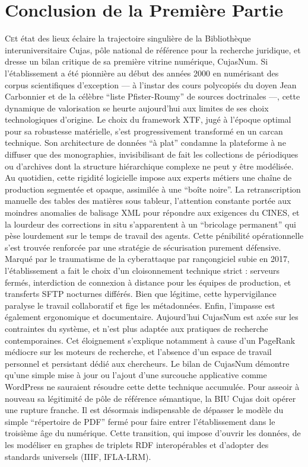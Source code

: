 \documentclass[12pt,twoside]{book}
\begin{document}
\section*{Conclusion de la Première Partie}
\lettrine{C}et état des lieux éclaire la trajectoire singulière de la Bibliothèque interuniversitaire Cujas, pôle national de référence pour la recherche juridique, et dresse un bilan critique de sa première vitrine numérique, CujasNum. Si l'établissement a été pionnière au début des années 2000 en numérisant des corpus scientifiques d'exception — à l'instar des cours polycopiés du doyen Jean Carbonnier et de la célèbre \enquote{liste Pfister-Roumy} de sources doctrinales —, cette dynamique de valorisation se heurte aujourd'hui aux limites de ses choix technologiques d'origine.
Le choix du framework \ac{XTF}, jugé à l'époque optimal pour sa robustesse matérielle, s'est progressivement transformé en un carcan technique. Son architecture de données \enquote{à plat} condamne la plateforme à ne diffuser que des monographies, invisibilisant de fait les collections de périodiques ou d'archives dont la structure hiérarchique complexe ne peut y être modélisée. Au quotidien, cette rigidité logicielle impose aux experts métiers une chaîne de production segmentée et opaque, assimilée à une \enquote{boîte noire}. La retranscription manuelle des tables des matières sous tableur, l'attention constante portée aux moindres anomalies de balisage \ac{XML} pour répondre aux exigences du \ac{CINES}, et la lourdeur des corrections in situ s'apparentent à un \enquote{bricolage permanent} qui pèse lourdement sur le temps de travail des agents.
Cette pénibilité opérationnelle s'est trouvée renforcée par une stratégie de sécurisation purement défensive. Marqué par le traumatisme de la cyberattaque par rançongiciel subie en 2017, l'établissement a fait le choix d'un cloisonnement technique strict : serveurs fermés, interdiction de connexion à distance pour les équipes de production, et transferts \ac{SFTP} nocturnes différés. Bien que légitime, cette hypervigilance paralyse le travail collaboratif et fige les métadonnées.
Enfin, l'impasse est également ergonomique et documentaire. Aujourd'hui CujasNum est axée sur les contraintes du système, et n'est plus adaptée aux pratiques de recherche contemporaines. Cet éloignement s'explique notamment à cause d'un PageRank médiocre sur les moteurs de recherche, et l'absence d'un espace de travail personnel et persistant dédié aux chercheurs.
Le bilan de CujasNum démontre qu'une simple mise à jour ou l'ajout d'une surcouche applicative comme WordPress ne sauraient résoudre cette dette technique accumulée. Pour asseoir à nouveau sa légitimité de pôle de référence sémantique, la \ac{BIU Cujas} doit opérer une rupture franche. Il est désormais indispensable de dépasser le modèle du simple \enquote{répertoire de PDF} fermé pour faire entrer l'établissement dans le troisième âge du numérique. Cette transition, qui impose d'ouvrir les données, de les modéliser en graphes de triplets \ac{RDF} interopérables et d'adopter des standards universels (IIIF, IFLA-LRM).
\end{document}
